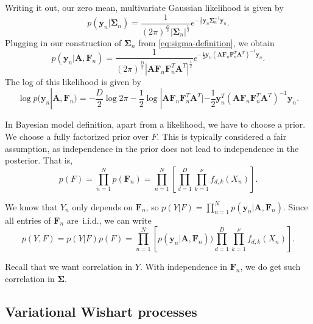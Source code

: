 Writing it out, our zero mean, multivariate Gaussian likelihood is given by
\begin{equation}
  p(\mathbf{y}_n|\mathbf{\Sigma}_n) = \frac{1}{(2\pi)^{\frac{D}{2}} |\mathbf{\Sigma}_n|^{\frac{1}{2}}} e^{-\frac{1}{2} \mathbf{y}_n \mathbf{\Sigma}_n^{-1} \mathbf{y}_n}.
\end{equation}
Plugging in our construction of $\mathbf{\Sigma}_n$ from \cref{eq:sigma-definition}, we obtain
\begin{equation}
  p(\mathbf{y}_n|\mathbf{A},\mathbf{F}_n) = \frac{1}{(2\pi)^{\frac{D}{2}} |\mathbf{A} \mathbf{F}_n \mathbf{F}_n^T \mathbf{A}^T|^{\frac{1}{2}}} e^{-\frac{1}{2} \mathbf{y}_n (\mathbf{A} \mathbf{F}_n \mathbf{F}_n^T \mathbf{A}^T)^{-1} \mathbf{y}_n}.
\end{equation}
The log of this likelihood is given by
\begin{equation}
  \log p(\mathbf{y}_n|\mathbf{A},\mathbf{F}_n) = - \frac{D}{2} \log 2\pi - \frac{1}{2} \log |\mathbf{A} \mathbf{F}_n \mathbf{F}_n^T \mathbf{A}^T| - \frac{1}{2} \mathbf{y}_n^T (\mathbf{A} \mathbf{F}_n \mathbf{F}_n^T \mathbf{A}^T)^{-1} \mathbf{y}_n.
\end{equation}

In Bayesian model definition, apart from a likelihood, we have to choose a prior.
We choose a fully factorized prior over $F$.
This is typically considered a fair assumption, as independence in the prior does not lead to independence in the posterior.
That is,
\begin{equation}
  p(F) = \prod_{n=1}^N p(\mathbf{F}_n) = \prod_{n=1}^N \left[ \prod_{d=1}^D \prod_{k=1}^\nu f_{d,k}(X_n) \right].
\end{equation}

We know that $Y_n$ only depends on $\mathbf{F}_n$, so $p(Y|F) = \prod_{n=1}^N p(\mathbf{y}_n|\mathbf{A},\mathbf{F}_n)$.
Since all entries of $\mathbf{F}_n$ are~i.i.d., we can write
\begin{equation}
  p(Y,F) = p(Y|F)p(F) = \prod_{n=1}^N \left[ p(\mathbf{y}_n|\mathbf{A},\mathbf{F}_n)) \prod_{d=1}^D \prod_{k=1}^\nu f_{d,k}(X_n) \right].
\end{equation}

Recall that we want correlation in $Y$.
With independence in $\mathbf{F}_n$, we do get such correlation in $\mathbf{\Sigma}$.

\subsection{Variational Wishart processes}

